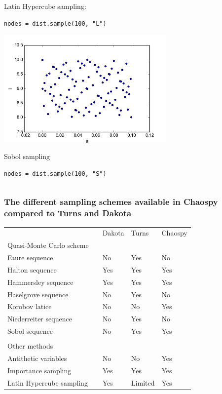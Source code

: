\documentclass[handout]{beamer}
\begin{document}
\begin{frame}[fragile]
\begin{columns}
\begin{center}
                Latin Hypercube sampling:

                \scriptsize
                \verb;nodes = dist.sample(100, "L");
                \normalsize



                \includegraphics[width=0.65\textwidth]{samples_S.png}

                Sobol sampling

                \scriptsize
                \verb;nodes = dist.sample(100, "S");
                \normalsize
     \end{center}
 \end{columns}
\end{frame}



\begin{frame}
  \frametitle{The different sampling schemes available in Chaospy compared to Turns and Dakota}
\begin{center}
\def\arraystretch{1.1}

  \begin{tabular}{ll|lll}
        && Dakota &	Turns &	Chaospy\\
  Quasi-Monte Carlo scheme && & & \\\hline
  Faure sequence &&	No &	Yes &	No\\
  Halton sequence &&	Yes& 	Yes	& Yes\\
  Hammersley sequence &&	Yes &	Yes &	Yes\\
  Haselgrove sequence &&	No &	Yes	& No\\
  Korobov latice &&	No &	No&	Yes\\
  Niederreiter sequence &&	No&	Yes&	No\\
  Sobol sequence &&	No &	Yes &	Yes\\\\

  Other methods &&&&\\\hline
  Antithetic variables &&	No&	No&	Yes\\
  Importance sampling &&	Yes	&Yes&	Yes\\
  Latin Hypercube sampling &&	Yes &	Limited &	Yes\\
\end{tabular}
\end{center}
\end{frame}
\end{document}
